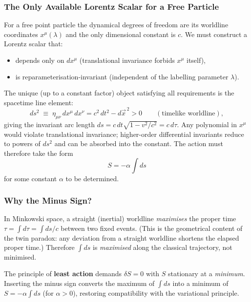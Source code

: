 \subsubsection*{The Only Available Lorentz Scalar for a Free Particle}

For a free point particle the dynamical degrees of freedom are its worldline
coordinates $x^\mu(\lambda)$ and the only dimensional constant is $c$.  We
must construct a Lorentz scalar that:
\begin{itemize}
    \item depends only on $dx^\mu$ (translational invariance forbids $x^\mu$
      itself),
    \item is reparameterisation-invariant (independent of the labelling
      parameter $\lambda$).
\end{itemize}
The unique (up to a constant factor) object satisfying all requirements is the
spacetime line element:
\begin{equation}\label{eq:lec06:line-element}
    ds^2 \;\equiv\; \eta_{\mu\nu}\,dx^\mu\,dx^\nu
         = c^2\,dt^2 - d\vec{x}^{\,2}
         > 0
    \qquad(\text{timelike worldline}),
\end{equation}
giving the invariant arc length $ds = c\,dt\sqrt{1-v^2/c^2} = c\,d\tau$.
Any polynomial in $x^\mu$ would violate translational invariance; higher-order
differential invariants reduce to powers of $ds^2$ and can be absorbed into
the constant.  The action must therefore take the form
\begin{equation}\label{eq:lec06:action-candidate}
    S = -\alpha \int ds
\end{equation}
for some constant $\alpha$ to be determined.

\subsubsection*{Why the Minus Sign?}

In Minkowski space, a straight (inertial) worldline \emph{maximises} the
proper time $\tau = \int d\tau = \int ds/c$ between two fixed events.  (This
is the geometrical content of the twin paradox: any deviation from a straight
worldline shortens the elapsed proper time.)  Therefore $\int ds$ is
\emph{maximised} along the classical trajectory, not minimised.

The principle of \textbf{least action} demands $\delta S = 0$ with $S$
stationary at a \emph{minimum}.  Inserting the minus sign converts the
maximum of $\int ds$ into a minimum of $S = -\alpha\int ds$ (for $\alpha > 0$),
restoring compatibility with the variational principle.

